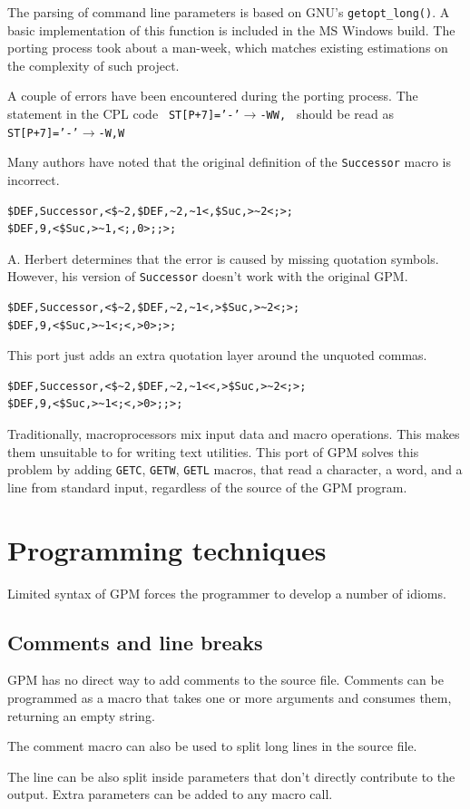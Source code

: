 \documentclass[letterpaper,10pt]{article}
\begin{document}
The parsing of command line parameters is based on GNU's \texttt{getopt\_long()}. 
A basic implementation of this function is included in the MS Windows build.
The porting process took about a man-week, which matches existing estimations 
on the complexity of such project.

A couple of errors have been encountered during the porting process.
The statement in the CPL code
\texttt{ ST[P+7]='-'$\rightarrow$-WW, } should be read as \texttt{ ST[P+7]='-'$\rightarrow$-W,W }

Many authors have noted that the original definition of the \texttt{Successor} macro is incorrect. 
\begin{verbatim}
$DEF,Successor,<$~2,$DEF,~2,~1<,$Suc,>~2<;>;
$DEF,9,<$Suc,>~1,<;,0>;;>;
\end{verbatim}
A. Herbert determines that the error is caused by missing quotation symbols. However, his
version of \texttt{Successor} doesn't work with the original GPM.
\begin{verbatim}
$DEF,Successor,<$~2,$DEF,~2,~1<,>$Suc,>~2<;>;
$DEF,9,<$Suc,>~1<;<,>0>;>;
\end{verbatim}
This port just adds an extra quotation layer around the unquoted commas. 
\begin{verbatim}
$DEF,Successor,<$~2,$DEF,~2,~1<<,>$Suc,>~2<;>;
$DEF,9,<$Suc,>~1<;<,>0>;;>;
\end{verbatim}

Traditionally, macroprocessors mix input data and macro operations. This makes them unsuitable
to for writing text utilities. This port of GPM solves this problem by adding
\texttt{GETC}, \texttt{GETW}, \texttt{GETL} macros, that read a character,
a word, and a line from standard input, regardless of the source
of the GPM program.

\section{Programming techniques}
Limited syntax of GPM forces the programmer to develop a number of idioms.

\subsection{Comments and line breaks}
GPM has no direct way to add comments to the source file.
Comments can be programmed as a macro that takes 
one or more arguments and consumes them, returning an empty string.

The comment macro can also be used to split long lines in the source file.

The line can be also split inside parameters that don't directly contribute
to the output. Extra parameters can be added to any macro call.
\end{document}
